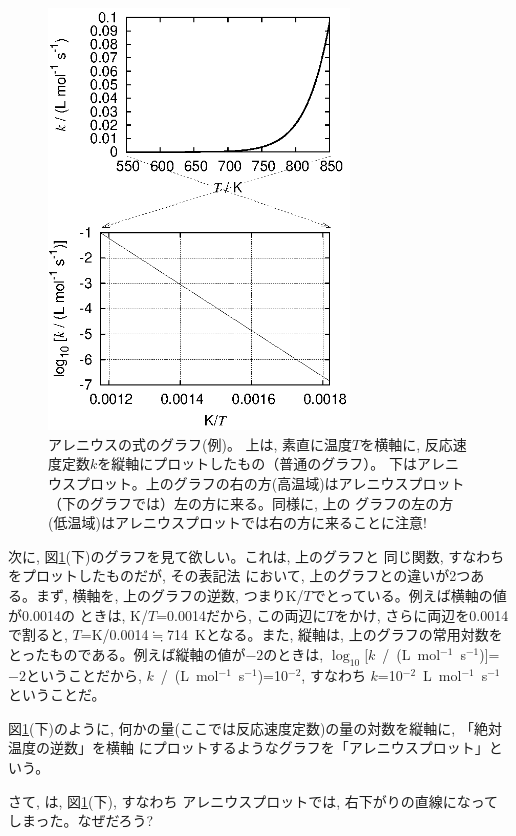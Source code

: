 \begin{figure}[h]
    \centering
    \includegraphics[width=8cm]{Arrhenius.eps}
    \caption{アレニウスの式のグラフ(例)。
上は, 素直に温度$T$を横軸に, 反応速度定数$k$を縦軸にプロットしたもの（普通のグラフ）。
下はアレニウスプロット。上のグラフの右の方(高温域)はアレニウスプロット（下のグラフでは）左の方に来る。同様に, 上の
グラフの左の方(低温域)はアレニウスプロットでは右の方に来ることに注意!}\label{fig:Arrhenius}
\end{figure}

次に, 図\ref{fig:Arrhenius}(下)のグラフを見て欲しい。これは, 上のグラフと
同じ関数, すなわちをプロットしたものだが, その表記法
において, 上のグラフとの違いが2つある。まず, 横軸を, 上のグラフの逆数, 
つまりK/$T$でとっている。例えば横軸の値が0.0014の
ときは, K/$T$=0.0014だから, この両辺に$T$をかけ, さらに両辺を0.0014で割ると, 
$T$=K/0.0014$\fallingdotseq$714~Kとなる。また, 縦軸は, 上のグラフの常用対数を
とったものである。例えば縦軸の値が$-2$のときは, 
$\log_{10}$[$k$~/~(L~mol$^{-1}$~s$^{-1}$)]=$-2$ということだから, 
$k$~/~(L~mol$^{-1}$~s$^{-1}$)=10$^{-2}$, すなわち
$k$=10$^{-2}$~L~mol$^{-1}$~s$^{-1}$ということだ。

図\ref{fig:Arrhenius}(下)のように, 
何かの量(ここでは反応速度定数)の量の対数を縦軸に, 「絶対温度の逆数」を横軸
にプロットするようなグラフを「アレニウスプロット」という。

さて, は, 図\ref{fig:Arrhenius}(下), すなわち
アレニウスプロットでは, 右下がりの直線になってしまった。なぜだろう?

